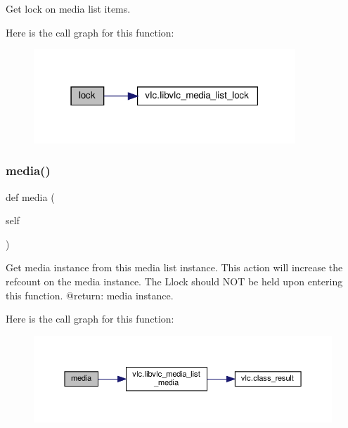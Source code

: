 \begin{DoxyVerb}Get lock on media list items.
\end{DoxyVerb}
 Here is the call graph for this function\+:
\nopagebreak
\begin{figure}[H]
\begin{center}
\leavevmode
\includegraphics[width=279pt]{classvlc_1_1_media_list_a8f6a887961a10aa3cbfe3ebed8e644ef_cgraph}
\end{center}
\end{figure}
\mbox{\label{classvlc_1_1_media_list_a393e14f0f4e676ad1af0f76b61842d0e}} 
\subsubsection{\texorpdfstring{media()}{media()}}
{\footnotesize\ttfamily def media (\begin{DoxyParamCaption}\item[{}]{self }\end{DoxyParamCaption})}

\begin{DoxyVerb}Get media instance from this media list instance. This action will increase
the refcount on the media instance.
The L{lock} should NOT be held upon entering this function.
@return: media instance.
\end{DoxyVerb}
 Here is the call graph for this function\+:
\nopagebreak
\begin{figure}[H]
\begin{center}
\leavevmode
\includegraphics[width=350pt]{classvlc_1_1_media_list_a393e14f0f4e676ad1af0f76b61842d0e_cgraph}
\end{center}
\end{figure}
\mbox{\label{classvlc_1_1_media_list_a4cd51e19135e5ad4a19eae3ea9c60537}} 

